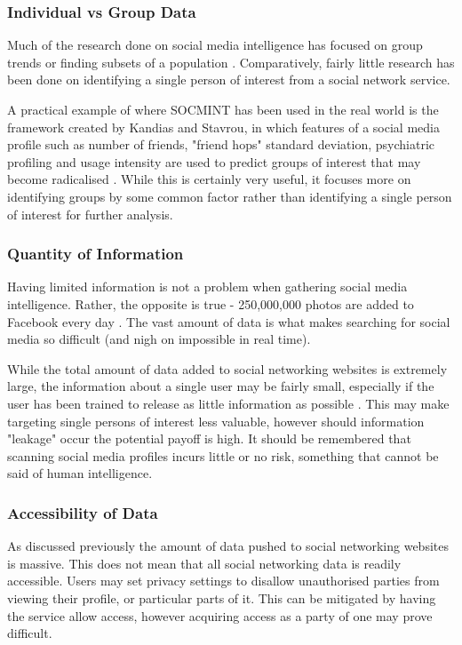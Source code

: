 \documentclass[12pt]{article}
\begin{document}
\subsubsection{Individual vs Group Data}
Much of the research done on social media intelligence has focused on group trends or finding subsets of a population \citep{socmintpublicsafety}\citep{socmintoverview}. Comparatively, fairly little research has been done on identifying a single person of interest from a social network service.

A practical example of where SOCMINT has been used in the real world is the framework created by Kandias and Stavrou, in which features of a social media profile such as number of friends, "friend hops" standard deviation, psychiatric profiling and usage intensity are used to predict groups of interest that may become radicalised \citep{behaviourdetection}. While this is certainly very useful, it focuses more on identifying groups by some common factor rather than identifying a single person of interest for further analysis.

\subsubsection{Quantity of Information}
Having limited information is not a problem when gathering social media intelligence. Rather, the opposite is true - 250,000,000 photos are added to Facebook every day \citep{socmintoverview}. The vast amount of data is what makes searching for social media so difficult (and nigh on impossible in real time).

While the total amount of data added to social networking websites is extremely large, the information about a single user may be fairly small, especially if the user has been trained to release as little information as possible \citep{behaviourdetection}. This may make targeting single persons of interest less valuable, however should information "leakage" occur the potential payoff is high. It should be remembered that scanning social media profiles incurs little or no risk, something that cannot be said of human intelligence.

\subsubsection{Accessibility of Data}
As discussed previously the amount of data pushed to social networking websites is massive. This does not mean that all social networking data is readily accessible. Users may set privacy settings to disallow unauthorised parties from viewing their profile, or particular parts of it. This can be mitigated by having the service allow access, however acquiring access as a party of one may prove difficult.
\end{document}
